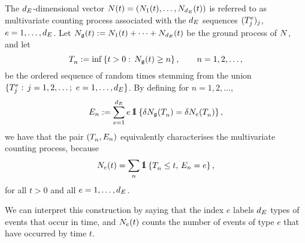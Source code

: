 \documentclass[10pt, article,table]{article}
\begin{document}
The $\numEventTypes$-dimensional vector $\multiCountingProc(t) = (\countingProc[1](t), \dots , \countingProc[\numEventTypes](t))$ is referred to as multivariate counting process associated with the $\numEventTypes$ sequences $(\arrivalTimes_{j})_j$, $e=1,\dots, \numEventTypes$. Let $\groundProc(t) := \countingProc[1](t)+ \dots + \countingProc[\numEventTypes](t)$ be the ground process of $\multiCountingProc$, and let 
\begin{equation*}
 \arrivalTimes[ ]_{n} := \inf \left\lbrace t>0: \, \groundProc(t) \geq n\right\rbrace, \qquad n=1,2,\dots, 
\end{equation*}
be the ordered sequence of random times stemming from the union $\lbrace \arrivalTimes_{j}: \, j=1,2,\dots; \,\, e=1,\dots,\numEventTypes\rbrace$. By defining for $n=1,2, \dots$, 
\begin{equation*}
 \event := \sum_{e=1}^{\numEventTypes} e \, \one\left\lbrace \delta \groundProc(\arrivalTimes[ ]_{n}) = \delta\countingProc(\arrivalTimes[ ]_{n}) \right\rbrace,
\end{equation*}
we have that the pair $(\arrivalTimes[ ]_{n}, \event[n])$ equivalently characterises the multivariate counting process, because 
\begin{equation}\label{eq.NTE_counting_proc}
 \countingProc(t) = \sum_{n} \one \left\lbrace \arrivalTimes[ ]_{n}\leq t, \, \event[n] = e\right\rbrace,
\end{equation}
for all $t>0$ and all $e=1,\dots, \numEventTypes$.

We can interpret this construction by saying that the index $e$ labels $\numEventTypes$ types of events that occur in time, and $\countingProc(t)$ counts the number of events of type $e$ that have occurred by time $t$. 
\end{document}
